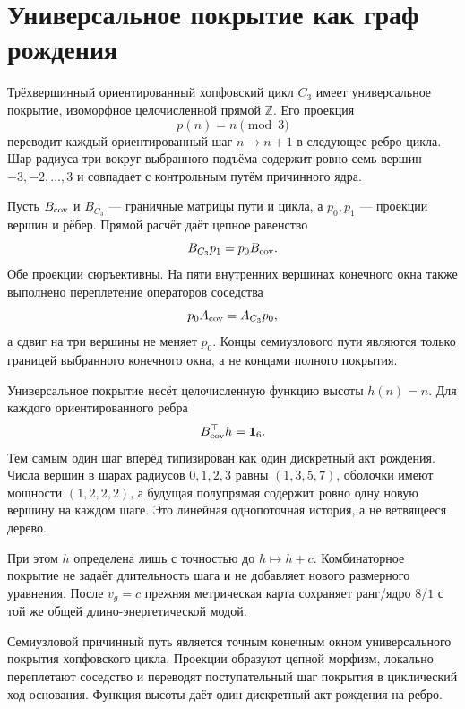 \chapter{Универсальное покрытие как граф рождения}
\label{ch:v10-nonequilibrium-bath-universal-cover-growth-graph}

Трёхвершинный ориентированный хопфовский цикл $C_3$ имеет универсальное
покрытие, изоморфное целочисленной прямой $\mathbb Z$. Его проекция
\begin{equation}
 p(n)=n\pmod 3
\end{equation}
переводит каждый ориентированный шаг $n\to n+1$ в следующее ребро цикла.
Шар радиуса три вокруг выбранного подъёма содержит ровно семь вершин
$-3,-2,\ldots,3$ и совпадает с контрольным путём причинного ядра.

Пусть $B_{\rm cov}$ и $B_{C_3}$ --- граничные матрицы пути и цикла, а
$p_0,p_1$ --- проекции вершин и рёбер. Прямой расчёт даёт цепное равенство
\begin{equation}
 B_{C_3}p_1=p_0B_{\rm cov}.
\end{equation}
Обе проекции сюръективны. На пяти внутренних вершинах конечного окна также
выполнено переплетение операторов соседства
\begin{equation}
 p_0A_{\rm cov}=A_{C_3}p_0,
\end{equation}
а сдвиг на три вершины не меняет $p_0$. Концы семиузлового пути являются
только границей выбранного конечного окна, а не концами полного покрытия.

Универсальное покрытие несёт целочисленную функцию высоты $h(n)=n$. Для
каждого ориентированного ребра
\begin{equation}
 B_{\rm cov}^{\top}h=\mathbf 1_6.
\end{equation}
Тем самым один шаг вперёд типизирован как один дискретный акт рождения.
Числа вершин в шарах радиусов $0,1,2,3$ равны $(1,3,5,7)$, оболочки имеют
мощности $(1,2,2,2)$, а будущая полупрямая содержит ровно одну новую вершину
на каждом шаге. Это линейная однопоточная история, а не ветвящееся дерево.

При этом $h$ определена лишь с точностью до $h\mapsto h+c$. Комбинаторное
покрытие не задаёт длительность шага и не добавляет нового размерного
уравнения. После $v_g=c$ прежняя метрическая карта сохраняет ранг/ядро
$8/1$ с той же общей длино-энергетической модой.

\begin{theorem}
Семиузловой причинный путь является точным конечным окном универсального
покрытия хопфовского цикла. Проекции образуют цепной морфизм, локально
переплетают соседство и переводят поступательный шаг покрытия в циклический
ход основания. Функция высоты даёт один дискретный акт рождения на ребро.
\end{theorem}

